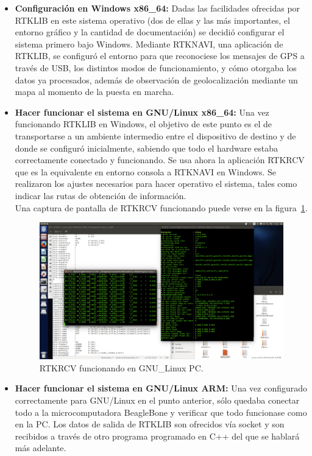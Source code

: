 \begin{itemize}
\item \textbf{Configuración en Windows x86\_64:} Dadas las facilidades ofrecidas por RTKLIB en este sistema operativo (dos de ellas y las más importantes, el entorno gráfico y la cantidad de documentación) se decidió configurar el sistema primero bajo Windows. Mediante RTKNAVI, una aplicación de RTKLIB, se configuró el entorno para que reconociese los mensajes de GPS a través de USB, los distintos modos de funcionamiento, y cómo otorgaba los datos ya procesados, además de observación de geolocalización mediante un mapa al momento de la puesta en marcha.\\
\item \textbf{Hacer funcionar el sistema en GNU/Linux x86\_64:} Una vez funcionando RTKLIB en Windows, el objetivo de este punto es el de transportarse a un ambiente intermedio entre el dispositivo de destino y de donde se configuró inicialmente, sabiendo que todo el hardware estaba correctamente conectado y funcionando. Se usa ahora la aplicación RTKRCV que es la equivalente en entorno consola a RTKNAVI en Windows. Se realizaron los ajustes necesarios para hacer operativo el sistema, tales como indicar las rutas de obtención de información.\\

Una captura de pantalla de RTKRCV funcionando puede verse en la figura~\ref{fig:rtkrcv1}.

\begin{figure}[H]
\centering
\includegraphics[scale=0.21]{Figures/LLH}
\caption[RTKRCV funcionando en GNU\_Linux PC.]{RTKRCV funcionando en GNU\_Linux PC.}
\label{fig:rtkrcv1}
\end{figure}

\item \textbf{Hacer funcionar el sistema en GNU/Linux ARM:} Una vez configurado correctamente para GNU/Linux en el punto anterior, sólo quedaba conectar todo a la microcomputadora BeagleBone y verificar que todo funcionase como en la PC. Los datos de salida de RTKLIB son ofrecidos vía socket y son recibidos a través de otro programa programado en C++ del que se hablará más adelante.
\end{itemize}


